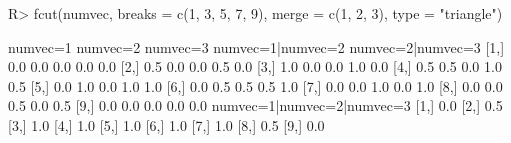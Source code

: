 \begin{Schunk}
% --begin: "fcut.merge2"
\begin{Sinput}
R> fcut(numvec, breaks = c(1, 3, 5, 7, 9), merge = c(1, 2, 3), type = "triangle")
\end{Sinput}
\begin{Soutput}
      numvec=1 numvec=2 numvec=3 numvec=1|numvec=2 numvec=2|numvec=3
 [1,]      0.0      0.0      0.0               0.0               0.0
 [2,]      0.5      0.0      0.0               0.5               0.0
 [3,]      1.0      0.0      0.0               1.0               0.0
 [4,]      0.5      0.5      0.0               1.0               0.5
 [5,]      0.0      1.0      0.0               1.0               1.0
 [6,]      0.0      0.5      0.5               0.5               1.0
 [7,]      0.0      0.0      1.0               0.0               1.0
 [8,]      0.0      0.0      0.5               0.0               0.5
 [9,]      0.0      0.0      0.0               0.0               0.0
      numvec=1|numvec=2|numvec=3
 [1,]                        0.0
 [2,]                        0.5
 [3,]                        1.0
 [4,]                        1.0
 [5,]                        1.0
 [6,]                        1.0
 [7,]                        1.0
 [8,]                        0.5
 [9,]                        0.0
\end{Soutput}
%
% --end: "fcut.merge2"
\end{Schunk}
